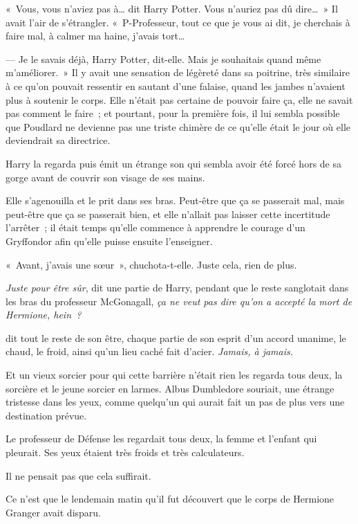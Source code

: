 «~Vous, vous n'aviez pas à… dit Harry Potter.
Vous n'auriez pas dû dire…~»
Il avait l'air de s'étrangler.
«~P-Professeur, tout ce que je vous ai dit, je cherchais à faire mal, à calmer ma haine, j'avais tort…

--- Je le savais déjà, Harry Potter, dit-elle.
Mais je souhaitais quand même m'améliorer.~»
Il y avait une sensation de légèreté dans sa poitrine, très similaire à ce qu'on pouvait ressentir en sautant d'une falaise, quand les jambes n'avaient plus à soutenir le corps.
Elle n'était pas certaine de pouvoir faire ça, elle ne savait pas comment le faire~; et pourtant, pour la première fois, il lui sembla possible que Poudlard ne devienne pas une triste chimère de ce qu'elle était le jour où elle deviendrait sa directrice.

Harry la regarda puis émit un étrange son qui sembla avoir été forcé hors de sa gorge avant de couvrir son visage de ses mains.

Elle s'agenouilla et le prit dans ses bras.
Peut-être que ça se passerait mal, mais peut-être que ça se passerait bien, et elle n'allait pas laisser cette incertitude l'arrêter~; il était temps qu'elle commence à apprendre le courage d'un Gryffondor afin qu'elle puisse ensuite l'enseigner.

«~Avant, j'avais une sœur~», chuchota-t-elle.
Juste cela, rien de plus.

\later

\emph{Juste pour être sûr}, dit une partie de Harry, pendant que le reste sanglotait dans les bras du professeur McGonagall, \emph{ça ne veut pas dire qu'on a accepté la mort de Hermione, hein~?}

\emph{} dit tout le reste de son être, chaque partie de son esprit d'un accord unanime, le chaud, le froid, ainsi qu'un lieu caché fait d'acier.
\emph{Jamais, à jamais.}

\later

Et un vieux sorcier pour qui cette barrière n'était rien les regarda tous deux, la sorcière et le jeune sorcier en larmes.
Albus Dumbledore souriait, une étrange tristesse dans les yeux, comme quelqu'un qui aurait fait un pas de plus vers une destination prévue.

\later

Le professeur de Défense les regardait tous deux, la femme et l'enfant qui pleurait.
Ses yeux étaient très froids et très calculateurs.

Il ne pensait pas que cela suffirait.

\later

Ce n'est que le lendemain matin qu'il fut découvert que le corps de Hermione Granger avait disparu.
